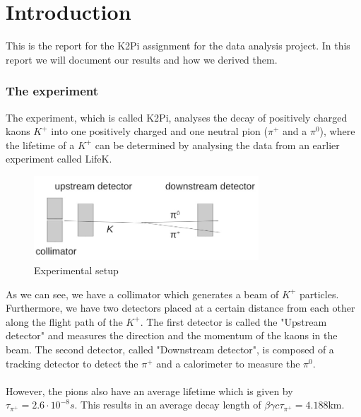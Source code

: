 \documentclass[a4paper,parskip,11pt, DIV12]{scrreprt}
\begin{document}
\renewcommand{\chaptermark}[1]{ \markboth{#1}{} } %



\chapter{Introduction}

This is the report for the K2Pi assignment for the data analysis project. In this report we will document our results and how we derived them.

\subsection*{The experiment}

The experiment, which is called K2Pi, analyses the decay of positively charged kaons $K^+$ into one positively charged and one neutral pion ($\pi^+$ and a $\pi^0$), where the lifetime of a $K^+$ can be determined by analysing the data from an earlier experiment called LifeK.

\begin{figure}[h] 
\centering
\includegraphics[width=0.75\textwidth]{ExperimentSetup.jpg} 
\caption{Experimental setup}
\label{fig:1}    
\end{figure}

As we can see, we have a collimator which generates a beam of $K^+$ particles. Furthermore, we have two detectors placed at a certain distance from each other along the flight path of the $K^+$. The first detector is called the "Upstream detector" and measures the direction and the momentum of the kaons in the beam. The second detector, called "Downstream detector", is composed of a tracking detector to detect the $\pi^+$ and a calorimeter to measure the $\pi^0$.
\\
\\
However, the pions also have an average lifetime which is given by $\tau_{\pi^+} = 2.6 \cdot 10^{-8}s$. This results in an average decay length of $\beta \gamma c\tau_{\pi^+} = 4.188$km.
\end{document}
